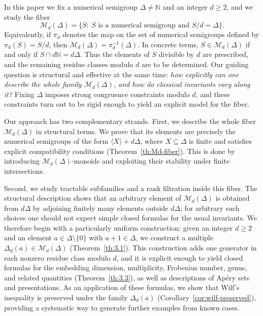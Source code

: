 \documentclass[12pt,a4paper]{amsart}
\theoremstyle{definition}
\theoremstyle{remark}
\begin{document}
In this paper we fix a numerical semigroup \(\Delta\neq\mathbb{N}\) and an integer
\(d\ge2\), and we study the fiber
\[
\mathcal{M}_d(\Delta)=\{S:\ S \text{ is a numerical semigroup and } S/d=\Delta\}.
\]
Equivalently, if \(\pi_d\) denotes the map on the set of numerical semigroups defined by \(\pi_d(S)=S/d\), then \(\mathcal{M}_d(\Delta)=\pi_d^{-1}(\Delta)\). In concrete terms, \(S\in\mathcal{M}_d(\Delta)\) if and only if \(S\cap d\mathbb{N}=d\Delta\). Thus the elements of \(S\) divisible by \(d\) are prescribed, and the remaining residue classes modulo \(d\) are to be determined. Our guiding question is structural and effective at the same time: \emph{how explicitly can one describe the whole family $\mathcal{M}_d(\Delta)$, and how do classical invariants vary along it?} Fixing $\Delta$ imposes strong congruence constraints modulo $d$, and these constraints turn out to be rigid enough to yield an explicit model for the fiber.

Our approach has two complementary strands. First, we describe the whole fiber $\mathcal{M}_d(\Delta)$ in structural terms. We prove that its elements are precisely the numerical semigroups of the form $\langle X\rangle+d\Delta$, where $X\subseteq\Delta$ is finite and satisfies explicit compatibility conditions (Theorem~\ref{th:Md-fiber}). This is done by introducing $\mathcal{M}_d(\Delta)$-monoids and exploiting their stability under finite intersections.

Second, we study tractable subfamilies and a rank filtration inside this fiber. The structural description shows that an arbitrary element of $\mathcal{M}_d(\Delta)$ is obtained from $d\Delta$ by adjoining finitely many elements outside $d\Delta$; for arbitrary such choices one should not expect simple closed formulas for the usual invariants. We therefore begin with a particularly uniform construction: given an integer $d\ge 2$ and an element $a\in \Delta \setminus\{0\}$ with $a+1\in \Delta$, we construct a multiple $\Delta_d(a) \in \mathcal{M}_d(\Delta)$ (Theorem~\ref{th:3.1}). This construction adds one generator in each nonzero residue class modulo $d$, and it is explicit enough to yield closed formulas for the embedding dimension, multiplicity, Frobenius number, genus, and related quantities (Theorem~\ref{th:3.3}), as well as descriptions of Ap\'ery sets and presentations. As an application of these formulas, we show that Wilf's inequality is preserved under the family $\Delta_d(a)$ (Corollary~\ref{cor:wilf-preserved}), providing a systematic way to generate further examples from known cases.
\end{document}
